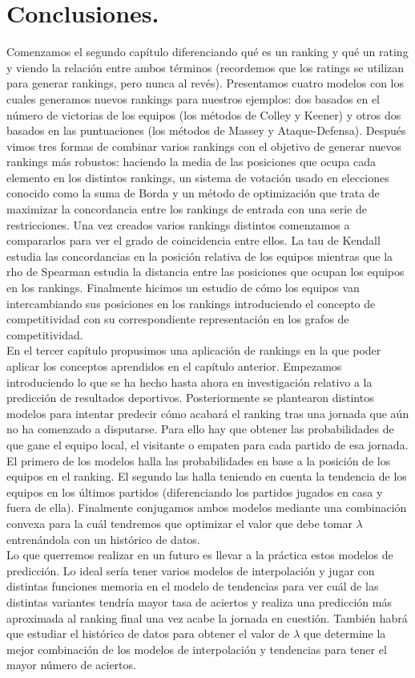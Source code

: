 \chapter{Conclusiones.}
Comenzamos el segundo capítulo diferenciando qué es un ranking y qué un rating y viendo la relación entre ambos términos (recordemos que los ratings se utilizan para generar rankings, pero nunca al revés). Presentamos cuatro modelos con los cuales generamos nuevos rankings para nuestros ejemplos: dos basados en el número de victorias de los equipos (los métodos de Colley y Keener) y otros dos basados en las puntuaciones (los métodos de Massey y Ataque-Defensa).
Después vimos tres formas de combinar varios rankings con el objetivo de generar nuevos rankings más robustos: haciendo la media de las posiciones que ocupa cada elemento en los distintos rankings, un sistema de votación usado en elecciones conocido como la suma de Borda y un método de optimización que trata de maximizar la concordancia entre los rankings de entrada con una serie de restricciones. 
Una vez creados varios rankings distintos comenzamos a compararlos para ver el grado de coincidencia entre ellos. La tau de Kendall estudia las concordancias en la posición relativa de los equipos mientras que la rho de Spearman estudia la distancia entre las posiciones que ocupan los equipos en los rankings. 
Finalmente hicimos un estudio de cómo los equipos van intercambiando sus posiciones en los rankings introduciendo el concepto de competitividad con su correspondiente representación en los grafos de competitividad.\\

En el tercer capítulo propusimos una aplicación de rankings en la que poder aplicar los conceptos aprendidos en el capítulo anterior. Empezamos introduciendo lo que se ha hecho hasta ahora en investigación relativo a la predicción de resultados deportivos. Posteriormente se plantearon distintos modelos para intentar predecir cómo acabará el ranking tras una jornada que aún no ha comenzado a disputarse. Para ello hay que obtener las probabilidades de que gane el equipo local, el visitante o empaten para cada partido de esa jornada. El primero de los modelos halla las probabilidades en base a la posición de los equipos en el ranking. El segundo las halla teniendo en cuenta la tendencia de los equipos en los últimos partidos (diferenciando los partidos jugados en casa y fuera de ella). Finalmente conjugamos ambos modelos mediante una combinación convexa para la cuál tendremos que optimizar el valor que debe tomar $\lambda$ entrenándola con un histórico de datos.\\

Lo que querremos realizar en un futuro es llevar a la práctica estos modelos de predicción. Lo ideal sería tener varios modelos de interpolación y jugar con distintas funciones memoria en el modelo de tendencias para ver cuál de las distintas variantes tendría mayor tasa de aciertos y realiza una predicción más aproximada al ranking final una vez acabe la jornada en cuestión. También habrá que estudiar el histórico de datos para obtener el valor de $\lambda$ que determine la mejor combinación de los modelos de interpolación y tendencias para tener el mayor número de aciertos.
